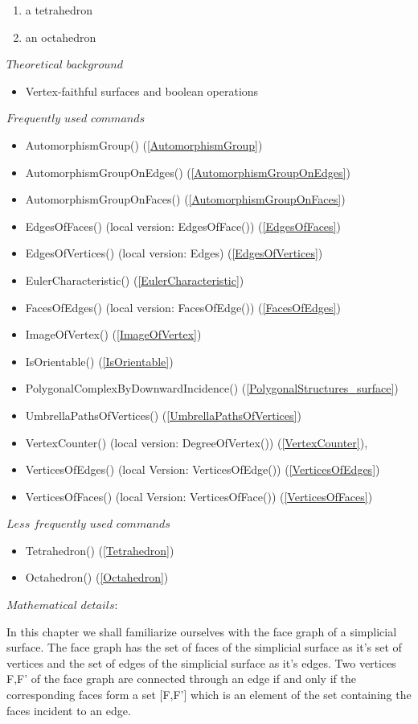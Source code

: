 \documentclass[a4paper,11pt]{report}
\begin{document}
{{\begin{enumerate}
\item  a tetrahedron 
\item  an octahedron 
\end{enumerate}
 $Theoretical$ $background$ 
\begin{itemize}
\item  Vertex-faithful surfaces and boolean operations 
\end{itemize}
 $Frequently$ $used$ $commands$ 
\begin{itemize}
\item  AutomorphismGroup() (\ref{AutomorphismGroup}) 
\item  AutomorphismGroupOnEdges() (\ref{AutomorphismGroupOnEdges}) 
\item  AutomorphismGroupOnFaces() (\ref{AutomorphismGroupOnFaces}) 
\item  EdgesOfFaces() (local version: EdgesOfFace()) (\ref{EdgesOfFaces}) 
\item  EdgesOfVertices() (local version: Edges) (\ref{EdgesOfVertices}) 
\item  EulerCharacteristic() (\ref{EulerCharacteristic}) 
\item  FacesOfEdges() (local version: FacesOfEdge()) (\ref{FacesOfEdges}) 
\item  ImageOfVertex() (\ref{ImageOfVertex}) 
\item  IsOrientable() (\ref{IsOrientable}) 
\item  PolygonalComplexByDownwardIncidence() (\ref{PolygonalStructures_surface}) 
\item  UmbrellaPathsOfVertices() (\ref{UmbrellaPathsOfVertices}) 
\item  VertexCounter() (local version: DegreeOfVertex()) (\ref{VertexCounter}), 
\item  VerticesOfEdges() (local Version: VerticesOfEdge()) (\ref{VerticesOfEdges}) 
\item  VerticesOfFaces() (local Version: VerticesOfFace()) (\ref{VerticesOfFaces}) 
\end{itemize}
 $Less$ $frequently$ $used$ $commands$ 
\begin{itemize}
\item  Tetrahedron() (\ref{Tetrahedron}) 
\item  Octahedron() (\ref{Octahedron}) 
\end{itemize}
 

 $ Mathematical$ $details:$ 

 In this chapter we shall familiarize ourselves with the face graph of a
simplicial surface. The face graph has the set of faces of the simplicial
surface as it's set of vertices and the set of edges of the simplicial surface
as it's edges. Two vertices F,F' of the face graph are connected through an
edge if and only if the corresponding faces form a set [F,F'] which is an
element of the set containing the faces incident to an edge. 

}}
\end{document}
